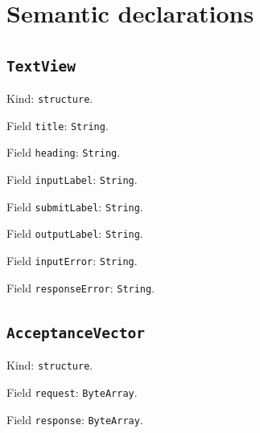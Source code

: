 \documentclass[11pt]{article}
\begin{document}
\section*{Semantic declarations}
\subsection*{\texttt{TextView}}
\noindent Kind: \texttt{structure}.\par
\noindent Field \texttt{title}: \texttt{String}.\par
\noindent Field \texttt{heading}: \texttt{String}.\par
\noindent Field \texttt{inputLabel}: \texttt{String}.\par
\noindent Field \texttt{submitLabel}: \texttt{String}.\par
\noindent Field \texttt{outputLabel}: \texttt{String}.\par
\noindent Field \texttt{inputError}: \texttt{String}.\par
\noindent Field \texttt{responseError}: \texttt{String}.\par
\subsection*{\texttt{AcceptanceVector}}
\noindent Kind: \texttt{structure}.\par
\noindent Field \texttt{request}: \texttt{ByteArray}.\par
\noindent Field \texttt{response}: \texttt{ByteArray}.\par
\end{document}
